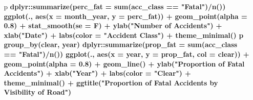 \documentclass[]{article}
\newenvironment{Shaded}{\begin{snugshade}}{\end{snugshade}}
\newcommand{\KeywordTok}[1]{\textcolor[rgb]{0.13,0.29,0.53}{\textbf{#1}}}
\newcommand{\DataTypeTok}[1]{\textcolor[rgb]{0.13,0.29,0.53}{#1}}
\newcommand{\FloatTok}[1]{\textcolor[rgb]{0.00,0.00,0.81}{#1}}
\newcommand{\StringTok}[1]{\textcolor[rgb]{0.31,0.60,0.02}{#1}}
\newcommand{\OperatorTok}[1]{\textcolor[rgb]{0.81,0.36,0.00}{\textbf{#1}}}
\newcommand{\NormalTok}[1]{#1}
\begin{document}
\begin{Shaded}
\begin{Highlighting}[]
{{{{{{{{{{{{\NormalTok{p }\OperatorTok{%
\StringTok{  }\NormalTok{dplyr}\OperatorTok{::}\KeywordTok{summarize}\NormalTok{(}\DataTypeTok{perc_fat =} \KeywordTok{sum}\NormalTok{(acc_class }\OperatorTok{==}\StringTok{ "Fatal"}\NormalTok{)}\OperatorTok{/}\KeywordTok{n}\NormalTok{()) }\OperatorTok{%
\StringTok{  }\KeywordTok{ggplot}\NormalTok{(., }\KeywordTok{aes}\NormalTok{(}\DataTypeTok{x =}\NormalTok{ month_year, }\DataTypeTok{y =}\NormalTok{ perc_fat)) }\OperatorTok{+}
\StringTok{  }\KeywordTok{geom_point}\NormalTok{(}\DataTypeTok{alpha =} \FloatTok{0.8}\NormalTok{) }\OperatorTok{+}\StringTok{ }
\StringTok{  }\KeywordTok{stat_smooth}\NormalTok{(}\DataTypeTok{se =}\NormalTok{ F) }\OperatorTok{+}\StringTok{ }\KeywordTok{ylab}\NormalTok{(}\StringTok{"Number of Accidents"}\NormalTok{) }\OperatorTok{+}\StringTok{ }\KeywordTok{xlab}\NormalTok{(}\StringTok{"Date"}\NormalTok{) }\OperatorTok{+}\StringTok{ }
\StringTok{  }\KeywordTok{labs}\NormalTok{(}\DataTypeTok{color =} \StringTok{"Accident Class"}\NormalTok{) }\OperatorTok{+}\StringTok{ }\KeywordTok{theme_minimal}\NormalTok{()}
\NormalTok{p }\OperatorTok{%
\StringTok{  }\KeywordTok{group_by}\NormalTok{(clear, year) }\OperatorTok{%
\StringTok{  }\NormalTok{dplyr}\OperatorTok{::}\KeywordTok{summarize}\NormalTok{(}\DataTypeTok{prop_fat =} \KeywordTok{sum}\NormalTok{(acc_class }\OperatorTok{==}\StringTok{ "Fatal"}\NormalTok{)}\OperatorTok{/}\KeywordTok{n}\NormalTok{()) }\OperatorTok{%
\StringTok{  }\KeywordTok{ggplot}\NormalTok{(., }\KeywordTok{aes}\NormalTok{(}\DataTypeTok{x =}\NormalTok{ year, }\DataTypeTok{y =}\NormalTok{ prop_fat, }\DataTypeTok{col =}\NormalTok{ clear)) }\OperatorTok{+}
\StringTok{  }\KeywordTok{geom_point}\NormalTok{(}\DataTypeTok{alpha =} \FloatTok{0.8}\NormalTok{) }\OperatorTok{+}\StringTok{ }\KeywordTok{geom_line}\NormalTok{() }\OperatorTok{+}\StringTok{ }\KeywordTok{ylab}\NormalTok{(}\StringTok{"Proportion of Fatal Accidents"}\NormalTok{) }\OperatorTok{+}\StringTok{ }\KeywordTok{xlab}\NormalTok{(}\StringTok{"Year"}\NormalTok{) }\OperatorTok{+}\StringTok{ }
\StringTok{  }\KeywordTok{labs}\NormalTok{(}\DataTypeTok{color =} \StringTok{"Clear"}\NormalTok{) }\OperatorTok{+}\StringTok{ }\KeywordTok{theme_minimal}\NormalTok{() }\OperatorTok{+}\StringTok{ }\KeywordTok{ggtitle}\NormalTok{(}\StringTok{"Proportion of Fatal Accidents by Visibility of Road"}\NormalTok{)}
}}}}}}}}}}}}}}}}}
\end{Highlighting}
\end{Shaded}
\end{document}
